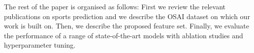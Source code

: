 
The rest of the paper is organised as follows: First we review the relevant publications on sports prediction and we describe the OSAI dataset on which our work is built on. Then, we describe the proposed feature set. Finally, we evaluate the performance of a range of state-of-the-art models with ablation studies and hyperparameter tuning.